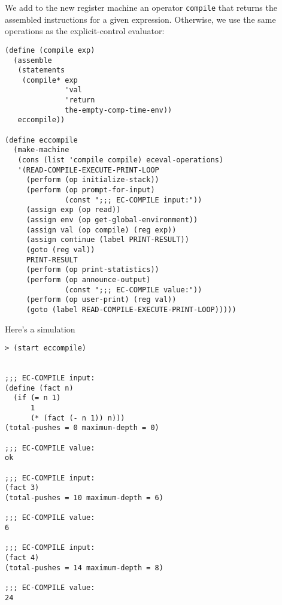 \documentclass[a4paper,12pt]{article}
\begin{document}
We add to the new register machine an operator \lstinline!compile!
that returns the assembled instructions for a given expression.
Otherwise, we use the same operations as the explicit-control evaluator:

\begin{lstlisting}
(define (compile exp)
  (assemble
   (statements
    (compile* exp
              'val
              'return
              the-empty-comp-time-env))
   eccompile))

(define eccompile
  (make-machine
   (cons (list 'compile compile) eceval-operations)
   '(READ-COMPILE-EXECUTE-PRINT-LOOP
     (perform (op initialize-stack))
     (perform (op prompt-for-input)
              (const ";;; EC-COMPILE input:"))
     (assign exp (op read))
     (assign env (op get-global-environment))
     (assign val (op compile) (reg exp))
     (assign continue (label PRINT-RESULT))
     (goto (reg val))
     PRINT-RESULT
     (perform (op print-statistics))
     (perform (op announce-output)
              (const ";;; EC-COMPILE value:"))
     (perform (op user-print) (reg val))
     (goto (label READ-COMPILE-EXECUTE-PRINT-LOOP)))))
\end{lstlisting}

Here's a simulation

\begin{lstlisting}
> (start eccompile)


;;; EC-COMPILE input:
(define (fact n)
  (if (= n 1)
      1
      (* (fact (- n 1)) n)))
(total-pushes = 0 maximum-depth = 0)

;;; EC-COMPILE value:
ok

;;; EC-COMPILE input:
(fact 3)
(total-pushes = 10 maximum-depth = 6)

;;; EC-COMPILE value:
6

;;; EC-COMPILE input:
(fact 4)
(total-pushes = 14 maximum-depth = 8)

;;; EC-COMPILE value:
24
\end{lstlisting}
\end{document}
